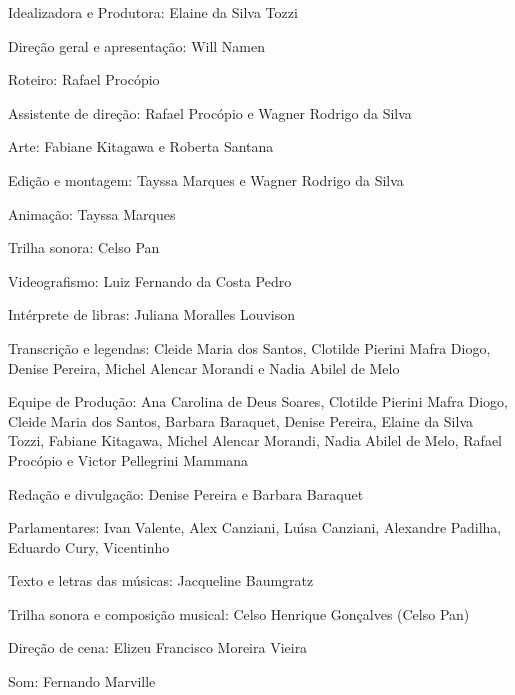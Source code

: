 \documentclass[
12pt,		%
openright,	%
twoside,  %
a4paper,			%
chapter=TITLE,		%
english,			%
french,				%
spanish,			%
brazil				%
]{USPSC-classe/USPSC}
\begin{document}
\begin{alineas}
\item Idealizadora e Produtora: Elaine da Silva Tozzi
\item Dire\c{c}\~ao geral e apresenta\c{c}\~ao: Will Namen
\item Roteiro: Rafael Proc\'opio
\item Assistente de dire\c{c}\~ao: Rafael Proc\'opio e Wagner Rodrigo da Silva
\item Arte: Fabiane Kitagawa e Roberta Santana
\item Edi\c{c}\~ao e montagem: Tayssa Marques e Wagner Rodrigo da Silva
\item Anima\c{c}\~ao: Tayssa Marques
\item Trilha sonora: Celso Pan
\item Videografismo: Luiz Fernando da Costa Pedro
\item Int\'erprete de libras: Juliana Moralles Louvison
\item Transcri\c{c}\~ao e legendas: Cleide Maria dos Santos, Clotilde Pierini Mafra Diogo, Denise Pereira, Michel Alencar Morandi e Nadia Abilel de Melo
\item Equipe de Produ\c{c}\~ao: Ana Carolina de Deus Soares, Clotilde Pierini Mafra Diogo, Cleide Maria dos Santos, Barbara Baraquet, Denise Pereira, Elaine da Silva Tozzi, Fabiane Kitagawa, Michel Alencar Morandi, Nadia Abilel de Melo, Rafael Proc\'opio e Victor Pellegrini Mammana
\item Reda\c{c}\~ao e divulga\c{c}\~ao: Denise Pereira e Barbara Baraquet
\item Parlamentares: Ivan Valente, Alex Canziani, Lu\'{\i}sa Canziani, Alexandre Padilha, Eduardo Cury, Vicentinho
\item Texto e letras das m\'usicas: Jacqueline Baumgratz
\item Trilha sonora e composi\c{c}\~ao musical: Celso Henrique Gon\c{c}alves (Celso Pan)
\item Dire\c{c}\~ao de cena: Elizeu Francisco Moreira Vieira
\item Som: Fernando Marville



\postextual


\end{alineas}
\end{document}
